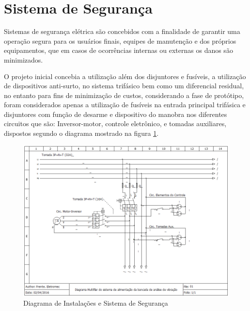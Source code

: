 \section{Sistema de Segurança}

Sistemas de segurança elétrica são concebidos com a finalidade de garantir uma operação segura para os usuários finais, equipes de manutenção e dos próprios equipamentos, que em casos de ocorrências internas ou externas os danos são minimizados.

O projeto inicial concebia a utilização além dos disjuntores e fusíveis, a utilização de dispositivos anti-surto, no sistema trifásico bem como um diferencial residual, no entanto para fins de minimização de custos, considerando a fase de protótipo, foram considerados apenas a utilização de fusíveis na entrada principal trifásica e disjuntores com função de desarme e dispositivo do manobra nos diferentes circuitos que são: Inversor-motor, controle eletrônico, e tomadas auxiliares, dispostos segundo o diagrama mostrado na figura \ref{Diagrama de Instalações}. 

\begin{figure}[h!]
	\centering
		\includegraphics[keepaspectratio=true,scale=0.6]{figuras/Diagrama_Instalacao.png}
	\caption{Diagrama de Instalações e Sistema de Segurança}
    \label{Diagrama de Instalações}
\end{figure}